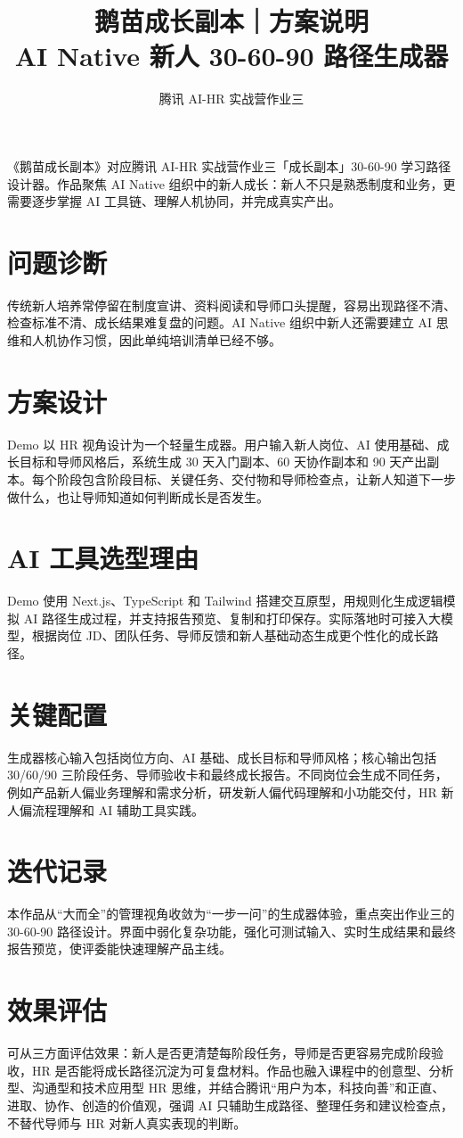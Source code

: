 \documentclass[UTF8,a4paper,11pt]{ctexart}
\title{\textbf{鹅苗成长副本｜方案说明}\\
\large AI Native 新人 30-60-90 路径生成器}
\author{腾讯 AI-HR 实战营作业三}
\date{}
\begin{document}
\maketitle

\begin{center}
\colorbox{SoftBlue}{\parbox{0.92\linewidth}{\small
《鹅苗成长副本》对应腾讯 AI-HR 实战营作业三「成长副本」30-60-90 学习路径设计器。作品聚焦 AI Native 组织中的新人成长：新人不只是熟悉制度和业务，更需要逐步掌握 AI 工具链、理解人机协同，并完成真实产出。
}}
\end{center}

\section{问题诊断}
传统新人培养常停留在制度宣讲、资料阅读和导师口头提醒，容易出现路径不清、检查标准不清、成长结果难复盘的问题。AI Native 组织中新人还需要建立 AI 思维和人机协作习惯，因此单纯培训清单已经不够。

\section{方案设计}
Demo 以 HR 视角设计为一个轻量生成器。用户输入新人岗位、AI 使用基础、成长目标和导师风格后，系统生成 30 天入门副本、60 天协作副本和 90 天产出副本。每个阶段包含阶段目标、关键任务、交付物和导师检查点，让新人知道下一步做什么，也让导师知道如何判断成长是否发生。

\section{AI 工具选型理由}
Demo 使用 Next.js、TypeScript 和 Tailwind 搭建交互原型，用规则化生成逻辑模拟 AI 路径生成过程，并支持报告预览、复制和打印保存。实际落地时可接入大模型，根据岗位 JD、团队任务、导师反馈和新人基础动态生成更个性化的成长路径。

\section{关键配置}
生成器核心输入包括岗位方向、AI 基础、成长目标和导师风格；核心输出包括 30/60/90 三阶段任务、导师验收卡和最终成长报告。不同岗位会生成不同任务，例如产品新人偏业务理解和需求分析，研发新人偏代码理解和小功能交付，HR 新人偏流程理解和 AI 辅助工具实践。

\section{迭代记录}
本作品从“大而全”的管理视角收敛为“一步一问”的生成器体验，重点突出作业三的 30-60-90 路径设计。界面中弱化复杂功能，强化可测试输入、实时生成结果和最终报告预览，使评委能快速理解产品主线。

\section{效果评估}
可从三方面评估效果：新人是否更清楚每阶段任务，导师是否更容易完成阶段验收，HR 是否能将成长路径沉淀为可复盘材料。作品也融入课程中的创意型、分析型、沟通型和技术应用型 HR 思维，并结合腾讯“用户为本，科技向善”和正直、进取、协作、创造的价值观，强调 AI 只辅助生成路径、整理任务和建议检查点，不替代导师与 HR 对新人真实表现的判断。
\end{document}

